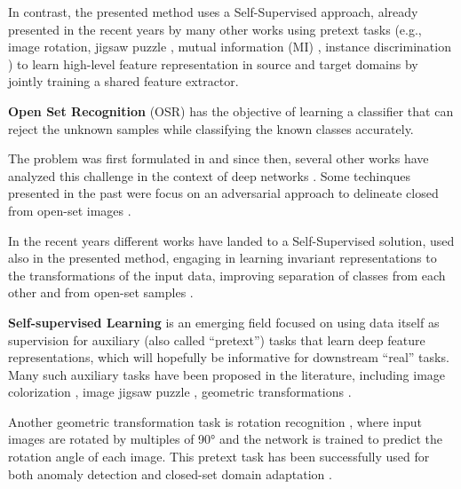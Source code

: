 \documentclass[10pt,twocolumn,letterpaper]{article}
\begin{document}
In contrast, the presented method uses a Self-Supervised approach, already presented in 
the recent years by many other works \cite{sun2019unsupervised,saito2020universal,yue2021prototypical}
using pretext tasks (e.g., image rotation, jigsaw puzzle \cite{CarlucciJigsaw}, mutual information (MI) \cite{selfsupfeng}, instance discrimination \cite{chen2020simple}) to learn high-level feature representation in 
source and target domains by jointly training a shared feature extractor.

\textbf{Open Set Recognition} (OSR) has the objective of learning a classifier 
that can reject the unknown samples while classifying the known classes accurately.

The problem was first formulated in \cite{firstPaperOSR} and since then, several other works have analyzed this challenge in the context 
of deep networks \cite{perera2019deep, hein2019relu, bendale2015open}.
Some techinques presented in the past were focus on an adversarial approach to 
delineate closed from open-set images \cite{ge2017generative, kong2021opengan}.

In the recent years different works have landed to a Self-Supervised solution, used also in the 
presented method, engaging in learning invariant representations to the 
transformations of the input data, improving separation of classes from each other 
and from open-set samples \cite{dhamija2021selfsupervised,jia2021selfsupervised,GeoTran}.

\textbf{Self-supervised Learning} is an emerging field focused on using 
data itself as supervision for auxiliary (also called “pretext”) 
tasks that learn deep feature representations, which will hopefully be informative 
for downstream “real” tasks.
Many such auxiliary tasks have been proposed in the literature, including
image colorization \cite{zhang2016colorful},
image jigsaw puzzle \cite{noroozi2017unsupervised}, geometric transformations \cite{dosovitskiy2015discriminative}.

Another geometric transformation task is rotation recognition \cite{OldROS}, where input images
are rotated by multiples of 90° and the network is trained to predict the rotation
angle of each image. This pretext task has been successfully used for both anomaly
detection \cite{GeoTran} and closed-set domain adaptation \cite{SelfSupervisedXu}.
\end{document}
